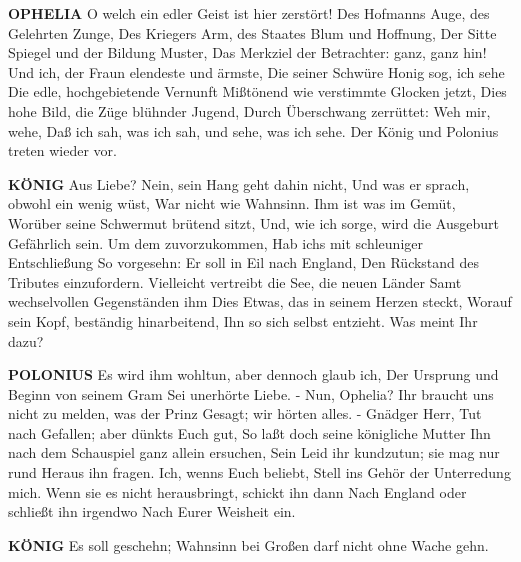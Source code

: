 \textbf{OPHELIA}
O welch ein edler Geist ist hier zerstört!
Des Hofmanns Auge, des Gelehrten Zunge,
Des Kriegers Arm, des Staates Blum und Hoffnung,
Der Sitte Spiegel und der Bildung Muster,
Das Merkziel der Betrachter: ganz, ganz hin!
Und ich, der Fraun elendeste und ärmste,
Die seiner Schwüre Honig sog, ich sehe
Die edle, hochgebietende Vernunft
Mißtönend wie verstimmte Glocken jetzt,
Dies hohe Bild, die Züge blühnder Jugend,
Durch Überschwang zerrüttet: Weh mir, wehe,
Daß ich sah, was ich sah, und sehe, was ich sehe.
Der König und Polonius treten wieder vor.

\textbf{KÖNIG}
Aus Liebe? Nein, sein Hang geht dahin nicht,
Und was er sprach, obwohl ein wenig wüst,
War nicht wie Wahnsinn. Ihm ist was im Gemüt,
Worüber seine Schwermut brütend sitzt,
Und, wie ich sorge, wird die Ausgeburt
Gefährlich sein. Um dem zuvorzukommen,
Hab ichs mit schleuniger Entschließung
So vorgesehn: Er soll in Eil nach England,
Den Rückstand des Tributes einzufordern.
Vielleicht vertreibt die See, die neuen Länder
Samt wechselvollen Gegenständen ihm
Dies Etwas, das in seinem Herzen steckt,
Worauf sein Kopf, beständig hinarbeitend,
Ihn so sich selbst entzieht. Was meint Ihr dazu?

\textbf{POLONIUS}
Es wird ihm wohltun, aber dennoch glaub ich,
Der Ursprung und Beginn von seinem Gram
Sei unerhörte Liebe. - Nun, Ophelia?
Ihr braucht uns nicht zu melden, was der Prinz
Gesagt; wir hörten alles. - Gnädger Herr,
Tut nach Gefallen; aber dünkts Euch gut,
So laßt doch seine königliche Mutter
Ihn nach dem Schauspiel ganz allein ersuchen,
Sein Leid ihr kundzutun; sie mag nur rund
Heraus ihn fragen. Ich, wenns Euch beliebt,
Stell ins Gehör der Unterredung mich.
Wenn sie es nicht herausbringt, schickt ihn dann
Nach England oder schließt ihn irgendwo
Nach Eurer Weisheit ein.

\textbf{KÖNIG}
Es soll geschehn;
Wahnsinn bei Großen darf nicht ohne Wache gehn.
